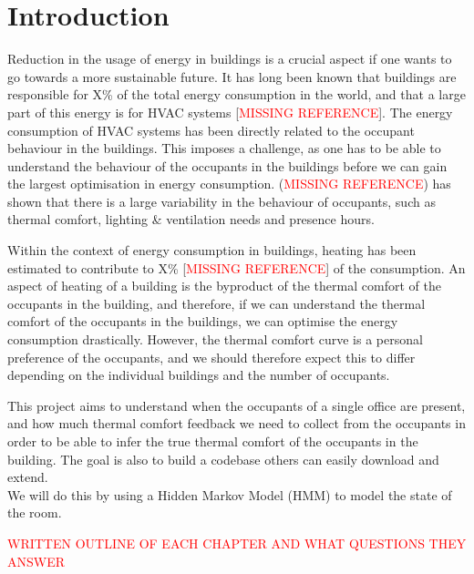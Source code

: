 \chapter{Introduction}
Reduction in the usage of energy in buildings is a crucial aspect
if one wants to go towards a more sustainable future.
It has long been known that buildings are responsible for X\% of the total energy
consumption in the world, and that a large part of this energy
is for HVAC systems [\textcolor{red}{MISSING REFERENCE}].
The energy consumption of HVAC systems has been directly related to the occupant behaviour in the
buildings. This imposes a challenge, as one has to be able to understand the behaviour of the occupants
in the buildings before we can gain the largest optimisation in energy consumption.
(\textcolor{red}{MISSING REFERENCE}) has shown that there is a large variability in the behaviour of occupants, such as
thermal comfort, lighting \& ventilation needs and presence hours.
\bigskip

Within the context of energy consumption in buildings, heating has been estimated
to contribute to X\% [\textcolor{red}{MISSING REFERENCE}] of the consumption.
An aspect of heating of a building is the byproduct of the thermal comfort of the occupants in the building,
and therefore, if we can understand the thermal comfort of the occupants in the buildings,
we can optimise the energy consumption drastically. However, the thermal comfort curve
is a personal preference of the occupants, and we should therefore expect this to differ depending
on the individual buildings and the number of occupants.

\bigskip
This project aims to understand when the occupants of a single office are present,
and how much thermal comfort feedback we need to collect from the occupants in order to be able to
infer the true thermal comfort of the occupants in the building.
The goal is also to build a codebase others can easily download and extend.\\
We will do this by using a Hidden Markov Model (HMM) to model the state of the room.


\bigskip
\textcolor{red}{WRITTEN OUTLINE OF EACH CHAPTER AND WHAT QUESTIONS THEY ANSWER}

